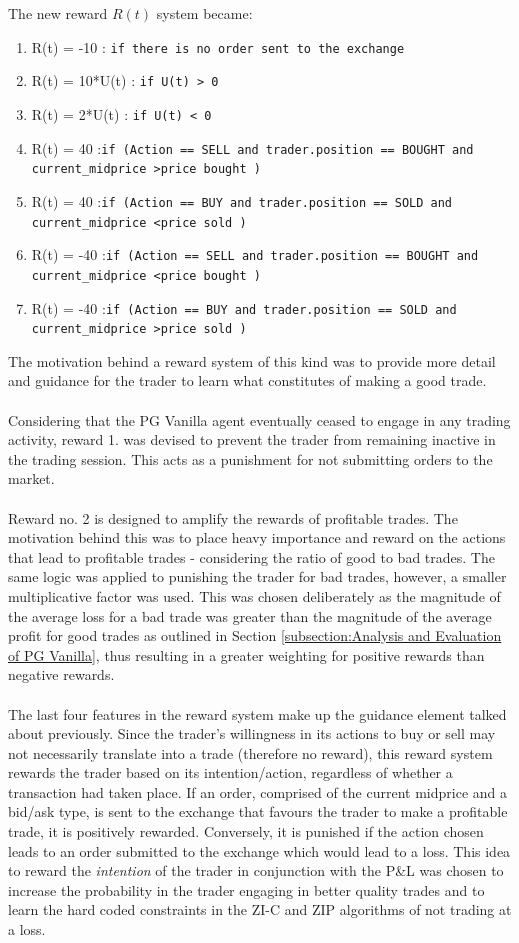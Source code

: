 \documentclass[ %
                    author={Ashwinder Khurana},
                supervisor={Prof Dave Cliff},
                    degree={MEng},
                     title={The Deeply Reinforced Trader},
                  subtitle={},
                      type={enterprise},
                      year={2020} ]{dissertation}
\begin{document}
{The new reward $R(t)$ system became: 
\begin{enumerate}
\item R(t) = -10 : \texttt{if there is no order sent to the exchange}
\item R(t) = 10*U(t) : \texttt{if U(t) > 0}
\item R(t) = 2*U(t) : \texttt{if U(t) < 0}
\item R(t) = 40 :\texttt{if (Action == SELL and trader.position == BOUGHT and current\_midprice \textgreater  price bought )}
\item R(t) = 40 :\texttt{if (Action == BUY and trader.position == SOLD and current\_midprice \textless  price sold )}
\item R(t) = -40 :\texttt{if (Action == SELL and trader.position == BOUGHT and current\_midprice \textless  price bought )}
\item R(t) = -40 :\texttt{if (Action == BUY and trader.position == SOLD and current\_midprice \textgreater  price sold )}
\end{enumerate}
\noindent
The motivation behind a reward system of this kind was to provide more detail and guidance for the trader to learn what constitutes of making a good trade. 
\\
\\
Considering that the PG Vanilla agent eventually ceased to engage in any trading activity, reward 1. was devised to prevent the trader from remaining inactive in the trading session. This acts as a punishment for not submitting orders to the market. 
\\
\\
Reward no. 2 is designed to amplify the rewards of profitable trades. The motivation behind this was to place heavy importance and reward on the actions that lead to profitable trades - considering the ratio of good to bad trades. The same logic was applied to punishing the trader for bad trades, however, a smaller multiplicative factor was used. This was chosen deliberately as the magnitude of the average loss for a bad trade was greater than the magnitude of the average profit for good trades as outlined in Section \ref{subsection:Analysis and Evaluation of PG Vanilla}, thus resulting in a greater weighting for positive rewards than negative rewards.
\\
\\
The last four features in the reward system make up the guidance element talked about previously. Since the trader's willingness in its actions to buy or sell may not necessarily translate into a trade (therefore no reward), this reward system rewards the trader based on its intention/action, regardless of whether a transaction had taken place. If an order, comprised of the current midprice and a bid/ask type, is sent to the exchange that favours the trader to make a profitable trade, it is positively rewarded. Conversely, it is punished if the action chosen leads to an order submitted to the exchange which would lead to a loss. This idea to reward the \textit{intention} of the trader in conjunction with the P\&L was chosen to increase the probability in the trader engaging in better quality trades and to learn the hard coded constraints in the ZI-C and ZIP algorithms of not trading at a loss.  
}
\end{document}
